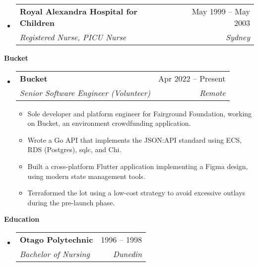 \documentclass[12pt]{article}
\makeatletter
\def \entryspacing {-0em}
\renewcommand{\section}[2]{\vspace{0.5ex}
  \colorbox{secondary}{\color{white}\raggedbottom\normalsize\textbf{{#1}{\hspace{0.5em}#2}}}
}
\newcommand{\resumeEntryStart}{\begin{itemize}[leftmargin=2.5mm]}
\newcommand{\resumeEntryEnd}{\end{itemize}\vspace{\entryspacing}}
\newcommand{\resumeItemListStart}{\begin{itemize}[leftmargin=4.5mm]}
\newcommand{\resumeItemListEnd}{\end{itemize}}
\newcommand{\resumeItem}[1]{
  \item\small{
    {#1 \vspace{-0.9ex}}
  }
}
\newcommand{\resumeEntryTSDL}[4]{
  \vspace{-0.5ex}\item[]
    \begin{tabularx}{0.97\textwidth}{X@{\hspace{5em}}r}
      \textbf{\color{primary}#1} & {\firabook\color{accent}\small#2} \\
      \textit{\color{accent}\small#3} & \textit{\color{accent}\small#4} \\
    \end{tabularx}\vspace{-0.9ex}
}
\makeatother
\begin{document}
  \resumeEntryStart
    \resumeEntryTSDL
      {Royal Alexandra Hospital for Children}{May 1999 -- May 2003}
      {Registered Nurse, PICU Nurse}{Sydney}
  \resumeEntryEnd

\section{\faFlask}{Bucket}

  \resumeEntryStart
    \resumeEntryTSDL
      {Bucket}{Apr 2022 -- Present}
      {Senior Software Engineer (Volunteer)}{Remote}
    \resumeItemListStart
      \resumeItem {Sole developer and platform engineer for Fairground Foundation, working on Bucket, an environment crowdfunding application.}
      \resumeItem {Wrote a Go API that implements the JSON:API standard using ECS, RDS (Postgres), sqlc, and Chi.}
      \resumeItem {Built a cross-platform Flutter application implementing a Figma design, using modern state management tools.}
      \resumeItem {Terraformed the lot using a low-cost strategy to avoid excessive outlays during the pre-launch phase.}
    \resumeItemListEnd
  \resumeEntryEnd

\section{\faGraduationCap}{Education}

  \resumeEntryStart
    \resumeEntryTSDL
      {Otago Polytechnic}{1996 -- 1998}
      {Bachelor of Nursing}{Dunedin}
  \resumeEntryEnd
\end{document}
